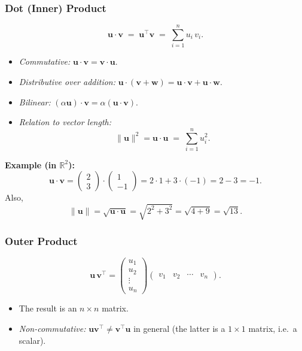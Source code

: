 \subsubsection{Dot (Inner) Product}
\[
\mathbf{u} \cdot \mathbf{v} \;=\; \mathbf{u}^\top \mathbf{v} \;=\; \sum_{i=1}^n u_i \, v_i.
\]
\begin{itemize}
\item \emph{Commutative:} $\mathbf{u} \cdot \mathbf{v} = \mathbf{v} \cdot \mathbf{u}$.
\item \emph{Distributive over addition:} $\mathbf{u} \cdot (\mathbf{v} + \mathbf{w}) 
      = \mathbf{u} \cdot \mathbf{v} + \mathbf{u} \cdot \mathbf{w}$.
\item \emph{Bilinear:} $(\alpha \mathbf{u}) \cdot \mathbf{v} = \alpha (\mathbf{u} \cdot \mathbf{v})$.
\item \emph{Relation to vector length:} 
      \[
        \|\mathbf{u}\|^2 = \mathbf{u} \cdot \mathbf{u} \;=\; \sum_{i=1}^n u_i^2.
      \]
\end{itemize}

\noindent
\textbf{Example (in $\mathbb{R}^2$):}
\[
\mathbf{u} \cdot \mathbf{v}
= \begin{pmatrix} 2 \\ 3 \end{pmatrix} 
  \cdot 
  \begin{pmatrix} 1 \\ -1 \end{pmatrix}
= 2 \cdot 1 + 3 \cdot (-1)
= 2 - 3
= -1.
\]
Also, 
\[
\|\mathbf{u}\| 
= \sqrt{\mathbf{u} \cdot \mathbf{u}}
= \sqrt{2^2 + 3^2}
= \sqrt{4 + 9}
= \sqrt{13}.
\]

\subsubsection{Outer Product}
\[
\mathbf{u} \, \mathbf{v}^\top =
\begin{pmatrix}
u_1 \\
u_2 \\
\vdots \\
u_n
\end{pmatrix}
\begin{pmatrix}
v_1 & v_2 & \cdots & v_n
\end{pmatrix}.
\]
\begin{itemize}
\item The result is an $n \times n$ matrix.
\item \emph{Non-commutative:} $\mathbf{u} \mathbf{v}^\top \neq \mathbf{v}^\top \mathbf{u}$ in general 
      (the latter is a $1 \times 1$ matrix, i.e.\ a scalar).
\end{itemize}

